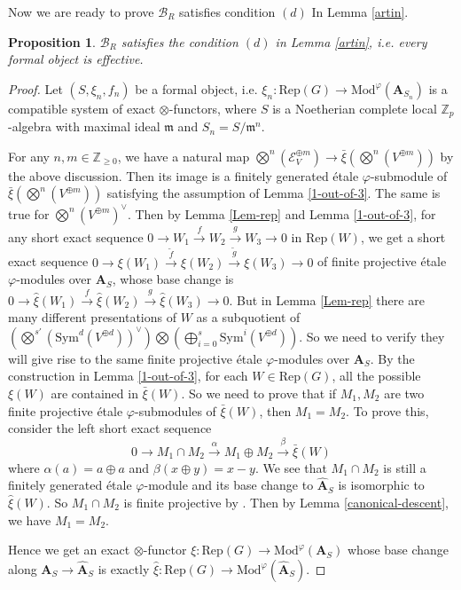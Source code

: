 \documentclass[10pt]{article}
\newtheorem{prop}[thm]{Proposition}
\numberwithin{equation}{section}
\newcommand{\frakm}{{\mathfrak m}}
\newcommand{\bZ}{{\mathbb Z}}
\newcommand{\calB}{{\mathcal B}}
\newcommand{\calE}{{\mathcal E}}
\newcommand{\Mod}{{\mathrm{Mod}}}           %
\newcommand{\Rep}{{\mathrm{Rep}}}           %
\newcommand{\Sym}{{\mathrm{Sym}}}           %
\newcommand{\bfA}{{\textbf{A}}}
\begin{document}
Now we are ready to prove $\calB_R$ satisfies condition $(d)$ In Lemma \ref{artin}.
\begin{prop}\label{effectivity}
    $\calB_R$ satisfies the condition $(d)$ in Lemma \ref{artin}, i.e. every formal object is effective.
\end{prop}
\begin{proof}
    Let $(S,\xi_n,f_n)$ be a formal object, i.e. $\xi_n:\Rep(G)\to \Mod^{\varphi}(\bfA_{S_n})$ is a compatible system of exact $\otimes$-functors, where $S$ is a Noetherian complete local $\bZ_p$-algebra with maximal ideal $\frakm$ and $S_n=S/\frakm^n$.

    For any $n,m\in\bZ_{\geq 0}$, we have a natural map $\bigotimes^n(\calE_V^{\oplus m})\to \bar \xi(\bigotimes^n(V^{\oplus m}))$  by the above discussion. Then its image is a finitely generated \'etale $\varphi$-submodule of $\bar \xi(\bigotimes^n(V^{\oplus m}))$ satisfying the assumption of Lemma \ref{1-out-of-3}. The same is true for $\bigotimes^n(V^{\oplus m})^{\vee}$. Then by Lemma \ref{Lem-rep} and Lemma \ref{1-out-of-3}, for any short exact sequence $0\to W_1\xrightarrow{f} W_2\xrightarrow{g}W_3\to 0$ in $\Rep(W)$, we get a short exact sequence $0\to \xi(W_1)\xrightarrow{\tilde f} \xi(W_2)\xrightarrow{\tilde g}\xi(W_3)\to 0$ of finite projective \'etale $\varphi$-modules over $\bfA_S$, whose base change is $0\to \widehat\xi(W_1)\xrightarrow{ f} \widehat\xi(W_2)\xrightarrow{g}\widehat \xi(W_3)\to 0$. But in Lemma \ref{Lem-rep} there are many different presentations of $W$ as a subquotient of $(\bigotimes^{s'}(\Sym^d(V^{\oplus d}))^{\vee})\bigotimes (\bigoplus_{i=0}^s\Sym^i(V^{\oplus d}))$. So we need to verify they will give rise to the same finite projective \'etale $\varphi$-modules over $\bfA_S$. By the construction in Lemma \ref{1-out-of-3}, for each $W\in \Rep(G)$, all the possible $\xi(W)$ are contained in $\bar\xi(W)$. So we need to prove that if $M_1,M_2$ are two finite projective \'etale $\varphi$-submodules of $\bar\xi(W)$, then $M_1=M_2$. To prove this, consider the left short exact sequence
    \[
    0\to M_1\cap M_2\xrightarrow{\alpha} M_1\oplus M_2\xrightarrow{\beta} \bar\xi(W)
    \]
    where $\alpha(a)=a\oplus a$ and $\beta(x\oplus y)=x-y$. We  see that $M_1\cap M_2$ is still a finitely generated \'etale $\varphi$-module and its base change to $\widehat\bfA_S$ is isomorphic to $\widehat\xi(W)$. So $M_1\cap M_2$ is finite projective by \cite[Theorem 5.5.20]{EG21}. Then by Lemma \ref{canonical-descent}, we have $M_1=M_2$. 
    
    
    Hence we get an exact $\otimes$-functor $\xi:\Rep(G)\to \Mod^{\varphi}(\bfA_{S})$ whose base change along $\bfA_S\to \widehat\bfA_S$ is exactly $\widehat \xi:\Rep(G)\to \Mod^{\varphi}(\widehat\bfA_{S})$.
\end{proof}
\end{document}
